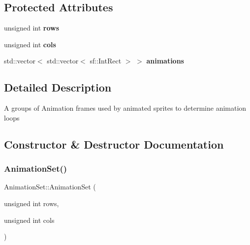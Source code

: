 \subsection*{Protected Attributes}
\begin{DoxyCompactItemize}
\item 
\mbox{\label{class_animation_set_a9e31574676175d9d5dc36ef5facf7150}} 
unsigned int {\bfseries rows}
\item 
\mbox{\label{class_animation_set_ababecc4cc5e80e68da53a9aabbef1c88}} 
unsigned int {\bfseries cols}
\item 
\mbox{\label{class_animation_set_aa36a8a16f556bb3609c8dc2b64030387}} 
std\+::vector$<$ std\+::vector$<$ sf\+::\+Int\+Rect $>$ $>$ {\bfseries animations}
\end{DoxyCompactItemize}


\subsection{Detailed Description}
A groups of Animation frames used by animated sprites to determine animation loops



\subsection{Constructor \& Destructor Documentation}
\mbox{\label{class_animation_set_a4291450987a71b6923ecdc44d38f3647}} 
\subsubsection{\texorpdfstring{Animation\+Set()}{AnimationSet()}\hspace{0.1cm}{\footnotesize\ttfamily [1/2]}}
{\footnotesize\ttfamily Animation\+Set\+::\+Animation\+Set (\begin{DoxyParamCaption}\item[{unsigned int}]{rows,  }\item[{unsigned int}]{cols }\end{DoxyParamCaption})}



